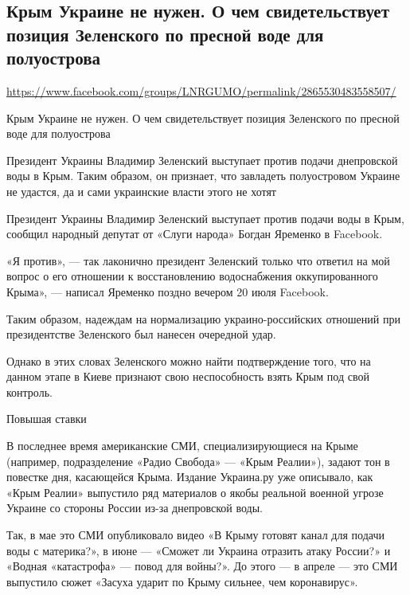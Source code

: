  
 
\subsection{Крым Украине не нужен. О чем свидетельствует позиция Зеленского по пресной воде для полуострова}
\label{sec:21_07_2020.fb.lnr.8}
\url{https://www.facebook.com/groups/LNRGUMO/permalink/2865530483558507/}
  

Крым Украине не нужен. О чем свидетельствует позиция Зеленского по пресной воде для полуострова

Президент Украины Владимир Зеленский выступает против подачи днепровской воды в Крым. Таким образом, он признает, что завладеть полуостровом Украине не удастся, да и сами украинские власти этого не хотят

Президент Украины Владимир Зеленский выступает против подачи воды в Крым, сообщил народный депутат от «Слуги народа» Богдан Яременко в Facebook.

«Я против», --- так лаконично президент Зеленский только что ответил на мой вопрос о его отношении к восстановлению водоснабжения оккупированного Крыма», --- написал Яременко поздно вечером 20 июля Facebook.

Таким образом, надеждам на нормализацию украино-российских отношений при президентстве Зеленского был нанесен очередной удар.

Однако в этих словах Зеленского можно найти подтверждение того, что на данном этапе в Киеве признают свою неспособность взять Крым под свой контроль.

Повышая ставки

В последнее время американские СМИ, специализирующиеся на Крыме (например, подразделение «Радио Свобода» --- «Крым Реалии»), задают тон в повестке дня, касающейся Крыма. Издание Украина.ру уже описывало, как «Крым Реалии» выпустило ряд материалов о якобы реальной военной угрозе Украине со стороны России из-за днепровской воды.

Так, в мае это СМИ опубликовало видео «В Крыму готовят канал для подачи воды с материка?», в июне --- «Сможет ли Украина отразить атаку России?» и «Водная «катастрофа» --- повод для войны?». До этого --- в апреле --- это СМИ выпустило сюжет «Засуха ударит по Крыму сильнее, чем коронавирус».

